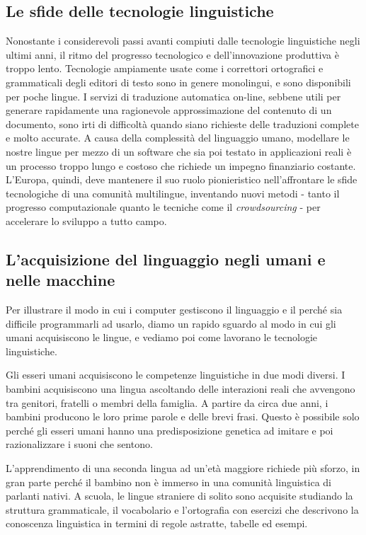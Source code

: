\documentclass[]{../../metanetpaper}
\begin{document}
\begin{multicols}{2}
\subsection{Le sfide delle tecnologie linguistiche}

Nonostante i considerevoli passi avanti compiuti dalle tecnologie linguistiche
negli ultimi anni, il ritmo del progresso tecnologico e dell'innovazione
produttiva \`{e} troppo lento. Tecnologie ampiamente usate come i correttori
ortografici e grammaticali degli editori di testo sono in genere monolingui, e
sono disponibili per poche lingue. I servizi di traduzione automatica on-line,
sebbene utili per  generare rapidamente una ragionevole approssimazione del
contenuto di un documento, sono irti di difficolt\`{a} quando siano richieste
delle traduzioni complete e molto accurate. A causa della complessit\`{a} del
linguaggio umano, modellare le nostre lingue per mezzo di un software che sia
poi testato in applicazioni reali \`{e} un processo troppo lungo e costoso che
richiede un impegno finanziario costante. L'Europa, quindi, deve mantenere il
suo ruolo pionieristico nell'affrontare le sfide tecnologiche di una
comunit\`{a} multilingue, inventando nuovi metodi - tanto il progresso
computazionale quanto le tecniche come il \emph{crowdsourcing} - per
accelerare lo sviluppo a tutto campo.




\subsection{L'acquisizione del linguaggio negli umani e nelle macchine}

Per illustrare il modo in cui i computer gestiscono il linguaggio e il perch\'{e}
sia difficile programmarli ad usarlo, diamo un rapido sguardo al modo in cui
gli umani acquisiscono le lingue, e vediamo poi come lavorano le tecnologie
linguistiche.

Gli esseri umani acquisiscono le competenze linguistiche in due modi
diversi. I bambini acquisiscono una lingua ascoltando delle interazioni reali
che avvengono tra genitori, fratelli o membri della famiglia. A partire da
circa due anni, i bambini producono le loro prime parole e delle brevi
frasi. Questo \`{e} possibile solo perch\'{e} gli esseri umani hanno una
predisposizione genetica ad imitare e poi razionalizzare i suoni che sentono.

L'apprendimento di una seconda lingua ad un'et\`{a} maggiore richiede pi\`{u}
sforzo, in gran parte perch\'{e} il bambino non \`{e} immerso in una
comunit\`{a} linguistica di parlanti nativi. A scuola, le lingue straniere di
solito sono acquisite studiando la struttura grammaticale, il vocabolario e
l'ortografia con esercizi che descrivono la conoscenza linguistica in termini
di regole astratte, tabelle ed esempi.


\end{multicols}
\end{document}
